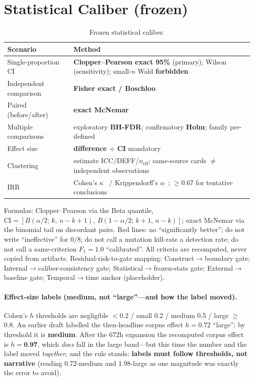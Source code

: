 \documentclass{article}
\begin{document}
\section{Statistical Caliber (frozen)}
\label{app:stats}
\begin{table}[h]
\caption{Frozen statistical caliber.}
\centering
\small
\begin{tabular}{@{}lp{9.5cm}@{}}
\toprule
Scenario & Method \\
\midrule
Single-proportion CI & \textbf{Clopper--Pearson exact 95\%} (primary); Wilson (sensitivity); small-$n$ Wald \textbf{forbidden} \\
Independent comparison & \textbf{Fisher exact / Boschloo} \\
Paired (before/after) & \textbf{exact McNemar} \\
Multiple comparisons & exploratory \textbf{BH-FDR}; confirmatory \textbf{Holm}; family pre-defined \\
Effect size & \textbf{difference $+$ CI} mandatory \\
Clustering & estimate ICC/DEFF/$n_{\text{eff}}$; same-source cards $\neq$ independent observations \\
IRR & Cohen's $\kappa$~\cite{cohen1960coefficient} / Krippendorff's $\alpha$~\cite{krippendorff1980content}; $\ge$0.67 for tentative conclusions \\
\bottomrule
\end{tabular}
\end{table}
Formulas: Clopper--Pearson via the Beta quantile,
$\text{CI}=[B(\alpha/2;\,k,\,n{-}k{+}1),\,B(1{-}\alpha/2;\,k{+}1,\,n{-}k)]$; exact McNemar via the
binomial tail on discordant pairs. Red lines: no ``significantly better''; do not write
``ineffective'' for $0/8$; do not call a mutation kill-rate a detection rate; do not call a
same-criterion $F_1{=}1.0$ ``calibrated''. All criteria are recomputed, never copied from
artifacts. Residual-risk-to-gate mapping: Construct$\to$boundary gate; Internal$\to$caliber-consistency
gate; Statistical$\to$frozen-stats gate; External$\to$baseline gate; Temporal$\to$time anchor (placeholder).

\paragraph{Effect-size labels (\textbf{medium}, not ``large''---and how the label moved).} Cohen's
$h$ thresholds are negligible $<$0.2 / small 0.2 / medium 0.5 / large $\ge$0.8. An earlier draft
labelled the then-headline corpus effect $h=0.72$ ``large''; by threshold it is \textbf{medium}.
After the 672h expansion the recomputed corpus effect is $h=\textbf{0.97}$, which \emph{does} fall
in the large band---but this time the number and the label moved \emph{together}, and the rule
stands: \textbf{labels must follow thresholds, not narrative} (reading 0.72-medium and 1.98-large
as one magnitude was exactly the error to avoid).
\end{document}
